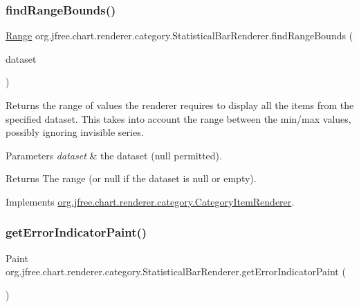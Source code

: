 \subsubsection{\texorpdfstring{find\+Range\+Bounds()}{findRangeBounds()}}
{\footnotesize\ttfamily \mbox{\hyperlink{classorg_1_1jfree_1_1data_1_1_range}{Range}} org.\+jfree.\+chart.\+renderer.\+category.\+Statistical\+Bar\+Renderer.\+find\+Range\+Bounds (\begin{DoxyParamCaption}\item[{\mbox{\hyperlink{interfaceorg_1_1jfree_1_1data_1_1category_1_1_category_dataset}{Category\+Dataset}}}]{dataset }\end{DoxyParamCaption})}

Returns the range of values the renderer requires to display all the items from the specified dataset. This takes into account the range between the min/max values, possibly ignoring invisible series.


\begin{DoxyParams}{Parameters}
{\em dataset} & the dataset ({\ttfamily null} permitted).\\
\hline
\end{DoxyParams}
\begin{DoxyReturn}{Returns}
The range (or {\ttfamily null} if the dataset is {\ttfamily null} or empty). 
\end{DoxyReturn}


Implements \mbox{\hyperlink{interfaceorg_1_1jfree_1_1chart_1_1renderer_1_1category_1_1_category_item_renderer_aa7294c25a26ffd1725d7920a6041a785}{org.\+jfree.\+chart.\+renderer.\+category.\+Category\+Item\+Renderer}}.

\mbox{\label{classorg_1_1jfree_1_1chart_1_1renderer_1_1category_1_1_statistical_bar_renderer_adf1749e835752e57cb21e5c52f4ddeb6}} 
\subsubsection{\texorpdfstring{get\+Error\+Indicator\+Paint()}{getErrorIndicatorPaint()}}
{\footnotesize\ttfamily Paint org.\+jfree.\+chart.\+renderer.\+category.\+Statistical\+Bar\+Renderer.\+get\+Error\+Indicator\+Paint (\begin{DoxyParamCaption}{ }\end{DoxyParamCaption})}

